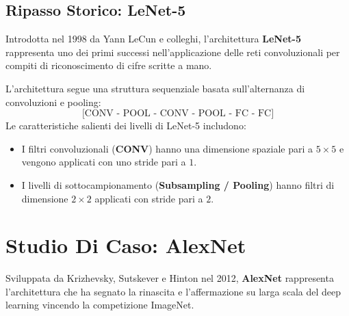 ﻿\documentclass[11pt, a4paper]{article}
\begin{document}
\subsection{Ripasso Storico: LeNet-5}

Introdotta nel 1998 da Yann LeCun e colleghi, l'architettura \textbf{LeNet-5} rappresenta uno dei primi successi nell'applicazione delle reti convoluzionali per compiti di riconoscimento di cifre scritte a mano.


L'architettura segue una struttura sequenziale basata sull'alternanza di convoluzioni e pooling:
\[
\text{[CONV - POOL - CONV - POOL - FC - FC]}
\]
Le caratteristiche salienti dei livelli di LeNet-5 includono:
\begin{itemize}
    \item I filtri convoluzionali (\textbf{CONV}) hanno una dimensione spaziale pari a $5 \times 5$ e vengono applicati con uno stride pari a $1$.
    \item I livelli di sottocampionamento (\textbf{Subsampling / Pooling}) hanno filtri di dimensione $2 \times 2$ applicati con stride pari a $2$.
\end{itemize}

\newpage

\section{Studio Di Caso: AlexNet}

Sviluppata da Krizhevsky, Sutskever e Hinton nel 2012, \textbf{AlexNet} rappresenta l'architettura che ha segnato la rinascita e l'affermazione su larga scala del deep learning vincendo la competizione ImageNet.

\end{document}
